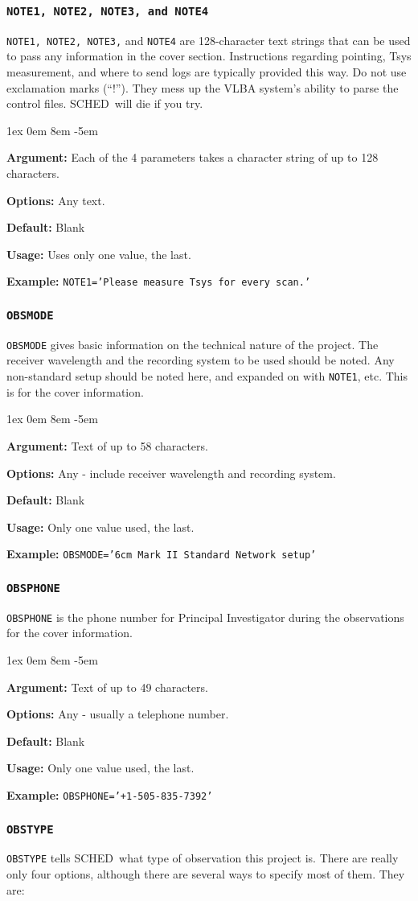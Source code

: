 \documentclass{report}
\newcommand{\schedb}{{\sc SCHED~}}
\newcommand{\rcwbox}[5]{
  \begin{list}{}{\parsep 1ex  \itemsep 0em
                 \leftmargin 8em  \itemindent -5em }
    \item {\bf Argument:} #1
    \item {\bf Options:}  #2
    \item {\bf Default:}  #3
    \item {\bf Usage:}    #4
    \item {\bf Example:}  #5
  \end{list}
}
\begin{document}
\subsubsection{\label{MP:NOTE1}{\tt NOTE1, NOTE2, NOTE3, and NOTE4}}

{\tt NOTE1, NOTE2, NOTE3,} and {\tt NOTE4} are 128-character text strings that
can be used to pass any information in the cover section. Instructions
regarding pointing, Tsys measurement, and where to send logs are typically
provided this way.  Do not use exclamation marks (``!'').  They mess up
the VLBA system's ability to parse the control files.  \schedb will die
if you try.

\rcwbox
{Each of the 4 parameters takes a character string of up to 128
characters.}
{Any text.}
{Blank}
{Uses only one value, the last.}
{{\tt NOTE1='Please measure Tsys for every scan.'}}


\subsubsection{\label{MP:OBSMODE}{\tt OBSMODE}}

{\tt OBSMODE} gives basic information on the technical nature of
the project. The receiver wavelength and the recording system to be
used should be noted. Any non-standard setup should be noted here, and
expanded on with {\tt NOTE1}, etc.  This is for the cover information.

\rcwbox
{Text of up to 58 characters.}
{Any - include receiver wavelength and recording system.}
{Blank}
{Only one value used, the last.}
{{\tt OBSMODE='6cm  Mark II  Standard Network setup'}}


\subsubsection{\label{MP:OBSPHONE}{\tt OBSPHONE}}

{\tt OBSPHONE} is the phone number for Principal Investigator during
the observations for the cover information.

\rcwbox
{Text of up to 49 characters.}
{Any - usually a telephone number.}
{Blank}
{Only one value used, the last.}
{{\tt OBSPHONE='+1-505-835-7392'}}

\subsubsection{\label{MP:OBSTYPE}{\tt OBSTYPE}}

{\tt OBSTYPE} tells \schedb what type of observation this project is.
There are really only four options, although there are several ways
to specify most of them.  They are:
\end{document}
